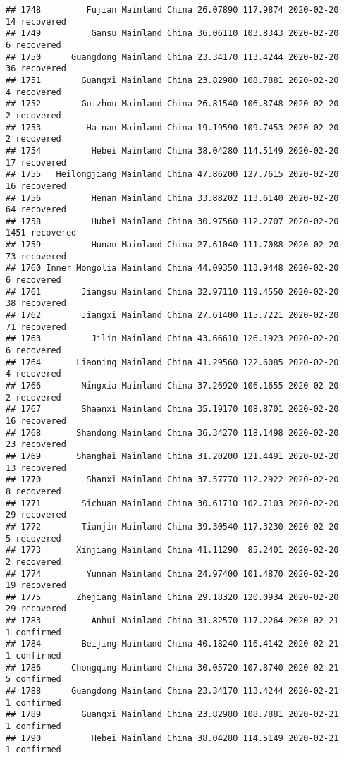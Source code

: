 \documentclass[
]{article}
\begin{document}
\begin{verbatim}
## 1748         Fujian Mainland China 26.07890 117.9874 2020-02-20    14 recovered
## 1749          Gansu Mainland China 36.06110 103.8343 2020-02-20     6 recovered
## 1750      Guangdong Mainland China 23.34170 113.4244 2020-02-20    36 recovered
## 1751        Guangxi Mainland China 23.82980 108.7881 2020-02-20     4 recovered
## 1752        Guizhou Mainland China 26.81540 106.8748 2020-02-20     2 recovered
## 1753         Hainan Mainland China 19.19590 109.7453 2020-02-20     2 recovered
## 1754          Hebei Mainland China 38.04280 114.5149 2020-02-20    17 recovered
## 1755   Heilongjiang Mainland China 47.86200 127.7615 2020-02-20    16 recovered
## 1756          Henan Mainland China 33.88202 113.6140 2020-02-20    64 recovered
## 1758          Hubei Mainland China 30.97560 112.2707 2020-02-20  1451 recovered
## 1759          Hunan Mainland China 27.61040 111.7088 2020-02-20    73 recovered
## 1760 Inner Mongolia Mainland China 44.09350 113.9448 2020-02-20     6 recovered
## 1761        Jiangsu Mainland China 32.97110 119.4550 2020-02-20    38 recovered
## 1762        Jiangxi Mainland China 27.61400 115.7221 2020-02-20    71 recovered
## 1763          Jilin Mainland China 43.66610 126.1923 2020-02-20     6 recovered
## 1764       Liaoning Mainland China 41.29560 122.6085 2020-02-20     4 recovered
## 1766        Ningxia Mainland China 37.26920 106.1655 2020-02-20     2 recovered
## 1767        Shaanxi Mainland China 35.19170 108.8701 2020-02-20    16 recovered
## 1768       Shandong Mainland China 36.34270 118.1498 2020-02-20    23 recovered
## 1769       Shanghai Mainland China 31.20200 121.4491 2020-02-20    13 recovered
## 1770         Shanxi Mainland China 37.57770 112.2922 2020-02-20     8 recovered
## 1771        Sichuan Mainland China 30.61710 102.7103 2020-02-20    29 recovered
## 1772        Tianjin Mainland China 39.30540 117.3230 2020-02-20     5 recovered
## 1773       Xinjiang Mainland China 41.11290  85.2401 2020-02-20     2 recovered
## 1774         Yunnan Mainland China 24.97400 101.4870 2020-02-20    19 recovered
## 1775       Zhejiang Mainland China 29.18320 120.0934 2020-02-20    29 recovered
## 1783          Anhui Mainland China 31.82570 117.2264 2020-02-21     1 confirmed
## 1784        Beijing Mainland China 40.18240 116.4142 2020-02-21     1 confirmed
## 1786      Chongqing Mainland China 30.05720 107.8740 2020-02-21     5 confirmed
## 1788      Guangdong Mainland China 23.34170 113.4244 2020-02-21     1 confirmed
## 1789        Guangxi Mainland China 23.82980 108.7881 2020-02-21     1 confirmed
## 1790          Hebei Mainland China 38.04280 114.5149 2020-02-21     1 confirmed

\end{verbatim}
\end{document}
